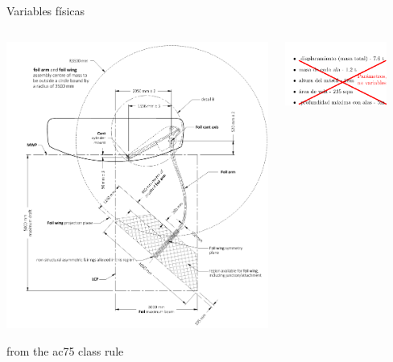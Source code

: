 \documentclass[presentation,aspectratio=169]{beamer}
\begin{document}
\begin{frame}[label={sec:orgf87f0d8}]{Variables físicas}
\begin{columns}
\begin{column}{0.5\columnwidth}
\begin{center}
\includegraphics[height=0.8\textheight]{../../figures/ac75-class-foil.png}
\end{center}

{\footnotesize from the ac75 class rule}
\end{column}
\begin{column}{0.5\columnwidth}
\begin{center}
\includegraphics[width=0.8\textwidth]{../../figures/parameters-not-variables}
\end{center}
\end{column}
\end{columns}
\end{frame}
\end{document}
